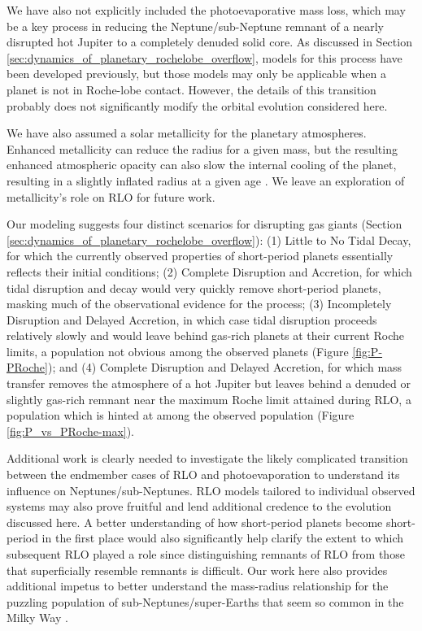 \documentclass{svjour3}                     %
\begin{document}
We have also not explicitly included the photoevaporative mass loss, which may be a key process in reducing the Neptune/sub-Neptune remnant of a nearly disrupted hot Jupiter to a completely denuded solid core. As discussed in Section \ref{sec:dynamics_of_planetary_rochelobe_overflow}, models for this process have been developed previously, but those models may only be applicable when a planet is not in Roche-lobe contact. However, the details of this transition probably does not significantly modify the orbital evolution considered here.

We have also assumed a solar metallicity for the planetary atmospheres. Enhanced metallicity can reduce the radius for a given mass, but the resulting enhanced atmospheric opacity can also slow the internal cooling of the planet, resulting in a slightly inflated radius at a given age \cite{2007ApJ...661..502B}. We leave an exploration of metallicity's role on RLO for future work.

Our modeling suggests four distinct scenarios for disrupting gas giants (Section \ref{sec:dynamics_of_planetary_rochelobe_overflow}): (1) Little to No Tidal Decay, for which the currently observed properties of short-period planets essentially reflects their initial conditions; (2) Complete Disruption and Accretion, for which tidal disruption and decay would very quickly remove short-period planets, masking much of the observational evidence for the process; (3) Incompletely Disruption and Delayed Accretion, in which case tidal disruption proceeds relatively slowly and would leave behind gas-rich planets at their current Roche limits, a population not obvious among the observed planets (Figure \ref{fig:P-PRoche}); and (4) Complete Disruption and Delayed Accretion, for which mass transfer removes the atmosphere of a hot Jupiter but leaves behind a denuded or slightly gas-rich remnant near the maximum Roche limit attained during RLO, a population which is hinted at among the observed population (Figure \ref{fig:P_vs_PRoche-max}). 

Additional work is clearly needed to investigate the likely complicated transition between the endmember cases of RLO and photoevaporation to understand its influence on Neptunes/sub-Neptunes. RLO models tailored to individual observed systems may also prove fruitful and lend additional credence to the evolution discussed here. A better understanding of how short-period planets become short-period in the first place would also significantly help clarify the extent to which subsequent RLO played a role since distinguishing remnants of RLO from those that superficially resemble remnants is difficult. Our work here also provides additional impetus to better understand the mass-radius relationship for the puzzling population of sub-Neptunes/super-Earths that seem so common in the Milky Way \cite{2014PNAS..11112655M}. 
\end{document}
